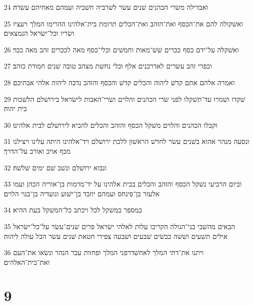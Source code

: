 \par 24 ואבדילה משׂרי הכהנים שׁנים עשׂר לשׁרביה חשׁביה ועמהם מאחיהם עשׂרה׃
\par 25 ואשׁקולה להם את־הכסף ואת־הזהב ואת־הכלים תרומת בית־אלהינו ההרימו המלך ויעציו ושׂריו וכל־ישׂראל הנמצאים׃
\par 26 ואשׁקלה על־ידם כסף ככרים שׁשׁ־מאות וחמשׁים וכלי־כסף מאה לככרים זהב מאה ככר׃
\par 27 וכפרי זהב עשׂרים לאדרכנים אלף וכלי נחשׁת מצהב טובה שׁנים חמודת כזהב׃
\par 28 ואמרה אלהם אתם קדשׁ ליהוה והכלים קדשׁ והכסף והזהב נדבה ליהוה אלהי אבתיכם׃
\par 29 שׁקדו ושׁמרו עד־תשׁקלו לפני שׂרי הכהנים והלוים ושׂרי־האבות לישׂראל בירושׁלם הלשׁכות בית יהוה׃
\par 30 וקבלו הכהנים והלוים משׁקל הכסף והזהב והכלים להביא לירושׁלם לבית אלהינו׃
\par 31 ונסעה מנהר אהוא בשׁנים עשׂר לחדשׁ הראשׁון ללכת ירושׁלם ויד־אלהינו היתה עלינו ויצילנו מכף אויב ואורב על־הדרך׃
\par 32 ונבוא ירושׁלם ונשׁב שׁם ימים שׁלשׁה׃
\par 33 וביום הרביעי נשׁקל הכסף והזהב והכלים בבית אלהינו על יד־מרמות בן־אוריה הכהן ועמו אלעזר בן־פינחס ועמהם יוזבד בן־ישׁוע ונועדיה בן־בנוי הלוים׃
\par 34 במספר במשׁקל לכל ויכתב כל־המשׁקל בעת ההיא׃
\par 35 הבאים מהשׁבי בני־הגולה הקריבו עלות לאלהי ישׂראל פרים שׁנים־עשׂר על־כל־ישׂראל אילים תשׁעים ושׁשׁה כבשׂים שׁבעים ושׁבעה צפירי חטאת שׁנים עשׂר הכל עולה ליהוה׃
\par 36 ויתנו את־דתי המלך לאחשׁדרפני המלך ופחוות עבר הנהר ונשׂאו את־העם ואת־בית־האלהים׃

\chapter{9}

